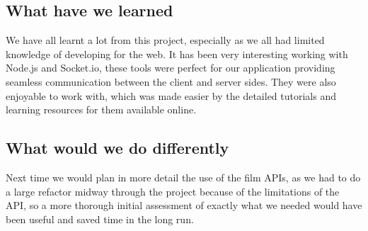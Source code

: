 \documentclass{article}
\begin{document}
\subsection{What have we learned}
We have all learnt a lot from this project, especially as we all had limited knowledge of developing for the web. It has been very interesting working with Node.js and Socket.io, these tools were perfect for our application providing seamless communication between the client and server sides. They were also enjoyable to work with, which was made easier by the detailed tutorials and learning resources for them available online.
\subsection{What would we do differently}
Next time we would plan in more detail the use of the film APIs, as we had to do a large refactor midway through the project because of the limitations of the API, so a more thorough initial assessment of exactly what we needed would have been useful and saved time in the long run.
\end{document}
